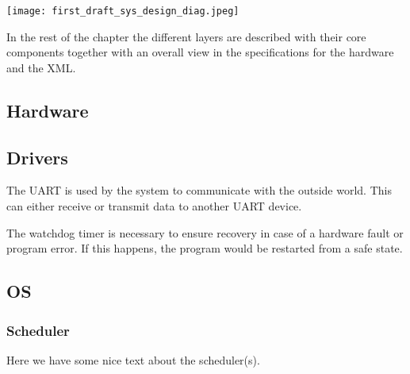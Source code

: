 \texttt{[image: first\_draft\_sys\_design\_diag.jpeg]}

In the rest of the chapter the different layers are described with their core
components together with an overall view in the specifications for the hardware
and the XML.


\subsection{Hardware}

\subsection{Drivers}
\begin{description}[align=left]
	\item [\textbf{UART driver}] The UART is used by the system to communicate with the outside
	world. This can either receive or transmit data to another UART device.
	\item [\textbf{Watchdog timer driver}] The watchdog timer is necessary to ensure recovery
	in case of a hardware fault or program error. If this happens, the program would be restarted
	from a safe state.

\end{description}

\subsection{OS}
\subsubsection{Scheduler}
Here we have some nice text about the scheduler(s).

